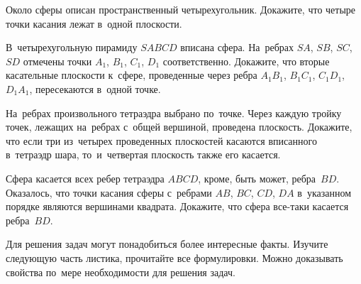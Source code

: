 \begin{problems}

\item
Около сферы описан пространственный четырехугольник.
Докажите, что четыре точки касания лежат в~одной плоскости.

\item
В~четырехугольную пирамиду $SABCD$ вписана сфера.
На~ребрах $SA$, $SB$, $SC$, $SD$ отмечены точки $A_1$, $B_1$, $C_1$, $D_1$
соответственно.
Докажите, что вторые касательные плоскости к~сфере, проведенные через ребра
$A_{1}B_{1}$, $B_{1}C_{1}$, $C_{1}D_{1}$, $D_{1}A_{1}$, пересекаются в~одной
точке.

\item
На~ребрах произвольного тетраэдра выбрано по~точке.
Через каждую тройку точек, лежащих на~ребрах с~общей вершиной, проведена
плоскость.
Докажите, что если три из~четырех проведенных плоскостей касаются вписанного
в~тетраэдр шара, то~и~четвертая плоскость также его касается.


\item
Сфера касается всех ребер тетраэдра $ABCD$, кроме, быть может, ребра~$BD$.
Оказалось, что точки касания сферы с~ребрами $AB$, $BC$, $CD$, $DA$ в~указанном
порядке являются вершинами квадрата.
Докажите, что сфера все-таки касается ребра~$BD$.


\end{problems}

Для решения задач могут понадобиться более интересные факты.
Изучите следующую часть листика, прочитайте все формулировки.
Можно доказывать свойства по~мере необходимости для решения задач.

